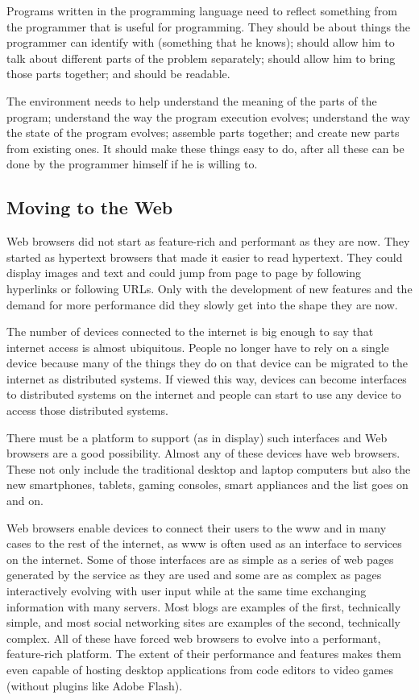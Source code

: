 \documentclass{./llncs2e/llncs}
\begin{document}
	
	Programs written in the programming language need to reflect something from the programmer that is useful for programming.
	They should be about things the programmer can identify with (something that he knows); should allow him to talk about different parts of the problem separately; should allow him to bring those parts together; and should be readable.
	
	The environment needs to help understand the meaning of the parts of the program; understand the way the program execution evolves; understand the way the state of the program evolves; assemble parts together; and create new parts from existing ones.
	It should make these things easy to do, after all these can be done by the programmer himself if he is willing to.

\subsection{Moving to the Web}
	Web browsers did not start as feature-rich and performant as they are now.
	They started as hypertext browsers that made it easier to read hypertext.
	They could display images and text and could jump from page to page by following hyperlinks or following URLs.
	Only with the development of new features and the demand for more performance did they slowly get into the shape they are now.

	The number of devices connected to the internet is big enough to say that internet access is almost ubiquitous.
	People no longer have to rely on a single device because many of the things they do on that device can be migrated to the internet as distributed systems.
	If viewed this way, devices can become interfaces to distributed systems on the internet and people can start to use any device to access those distributed systems.

	There must be a platform to support (as in display) such interfaces and Web browsers are a good possibility.
	Almost any of these devices have web browsers.
	These not only include the traditional desktop and laptop computers but also the new smartphones, tablets, gaming consoles, smart appliances and the list goes on and on.

	Web browsers enable devices to connect their users to the \ac{www} and in many cases to the rest of the internet, as \ac{www} is often used as an interface to services on the internet.
	Some of those interfaces are as simple as a series of web pages generated by the service as they are used and some are as complex as pages interactively evolving with user input while at the same time exchanging information with many servers.
	Most blogs are examples of the first, technically simple, and most social networking sites are examples of the second, technically complex.
	All of these have forced web browsers to evolve into a performant, feature-rich platform.
	The extent of their performance and features makes them even capable of hosting desktop applications from code editors to video games (without plugins like Adobe Flash).
\end{document}
